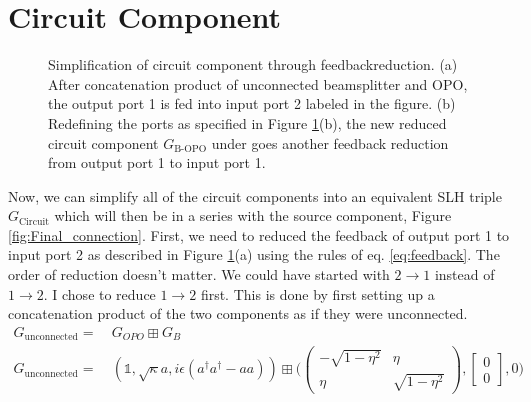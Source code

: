 \documentclass[a4paper]{article}
\begin{document}
\section*{Circuit Component}
\begin{figure}[H]
\centering
     \hspace{2cm}

     \caption{Simplification of circuit component through feedbackreduction. (a) After concatenation product of unconnected beamsplitter and OPO, the output port 1 is fed into input port 2 labeled in the figure. (b) Redefining the ports as specified in Figure \ref{fig:circuit}(b), the new reduced circuit  component $G_{\text{B-OPO}}$ under goes another feedback reduction from output port 1 to input port 1.}
     \label{fig:circuit}
\end{figure}     
Now, we can simplify all of the circuit components into an equivalent SLH triple $G_{\text{Circuit}}$ which will then be in a series with the source component, Figure \ref{fig:Final_connection}. First, we need to reduced the feedback of output port 1 to input port 2 as described in Figure \ref{fig:circuit}(a) using the rules of eq. \ref{eq:feedback}. The order of reduction doesn't matter. We could have started with $2 \rightarrow 1$ instead of $1 \rightarrow 2$. I chose to reduce $1 \rightarrow 2$ first. This is done by first setting up a concatenation product of the two components as if they were unconnected.
\begin{align*}
    G_{\text{unconnected}} = & \ G_{OPO}  \boxplus G_B \\
    G_{\text{unconnected}} = & \  (\mathbb{1}, \sqrt{\kappa}a, i\epsilon(a^\dagger a^\dagger - a a))   \boxplus \Bigg( \begin{pmatrix} -\sqrt{1-\eta^2} & \eta \\ \eta & \sqrt{1-\eta^2} \end{pmatrix},\begin{bmatrix} 0 \\ 0\end{bmatrix}, 0 \Bigg)
\end{align*}
\end{document}
